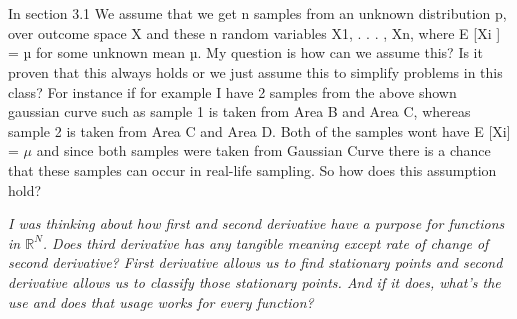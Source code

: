 \documentclass{article}
\begin{document}







\\ \\
In section 3.1 We assume that we get n samples from an unknown distribution p, over outcome space X and these n random variables X1, . . . , Xn, where E [Xi
] = µ for
some unknown mean µ. My question is how can we assume this? Is it proven that this always holds or we just assume this to simplify problems in this class? For instance if for example I have 2 samples from the above shown gaussian curve such as sample 1 is taken from Area B and Area C, whereas sample 2 is taken from Area C and Area D. Both of the samples wont have E [Xi] = $\mu$ and since both samples were taken from Gaussian Curve there is a chance that these samples can occur in real-life sampling. So how does this assumption hold?



\textit{I was thinking about how first and second derivative have a purpose for functions in $\mathbb{R}^N$. Does third derivative has any tangible meaning except rate of change of second derivative? First derivative allows us to find stationary points and second derivative allows us to classify those stationary points. And if it does, what's the use and does that usage works for every function? }\\\\
\end{document}

